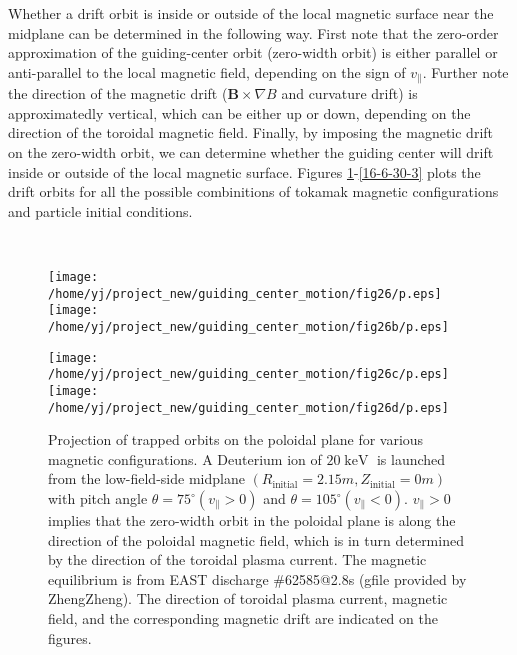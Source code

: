 \documentclass{article}
\newcommand{\tmop}[1]{\ensuremath{\operatorname{#1}}}
\begin{document}
Whether a drift orbit is inside or outside of the local magnetic surface near
the midplane can be determined in the following way. First note that the
zero-order approximation of the guiding-center orbit (zero-width orbit) is
either parallel or anti-parallel to the local magnetic field, depending on the
sign of $v_{\parallel}$. Further note the direction of the magnetic drift
($\mathbf{B} \times \nabla B$ and curvature drift) is approximatedly vertical,
which can be either up or down, depending on the direction of the toroidal
magnetic field. Finally, by imposing the magnetic drift on the zero-width
orbit, we can determine whether the guiding center will drift inside or
outside of the local magnetic surface. Figures \ref{16-6-30-1}-\ref{16-6-30-3}
plots the drift orbits for all the possible combinitions of tokamak magnetic
configurations and particle initial conditions.

\

\begin{figure}[h]
  \texttt{[image: /home/yj/project\_new/guiding\_center\_motion/fig26/p.eps]}\texttt{[image: /home/yj/project\_new/guiding\_center\_motion/fig26b/p.eps]}
  
  \texttt{[image: /home/yj/project\_new/guiding\_center\_motion/fig26c/p.eps]}\texttt{[image: /home/yj/project\_new/guiding\_center\_motion/fig26d/p.eps]}
  \caption{\label{16-6-30-1}Projection of trapped orbits on the poloidal plane
  for various magnetic configurations. A Deuterium ion of $20 \tmop{keV}$ is
  launched from the low-field-side midplane $(R_{\tmop{initial}} = 2.15 m,
  Z_{\tmop{initial}} = 0 m)$ with pitch angle $\theta = 75^{\circ}
  (v_{\parallel} > 0)$ and $\theta = 105^{\circ} (v_{\parallel} < 0)$.
  $v_{\parallel} > 0$ implies that the zero-width orbit in the poloidal plane
  is along the direction of the poloidal magnetic field, which is in turn
  determined by the direction of the toroidal plasma current. The magnetic
  equilibrium is from EAST discharge \#62585@2.8s (gfile provided by
  ZhengZheng). The direction of toroidal plasma current, magnetic field, and
  the corresponding magnetic drift are indicated on the figures.}
\end{figure}

\

\
\end{document}
